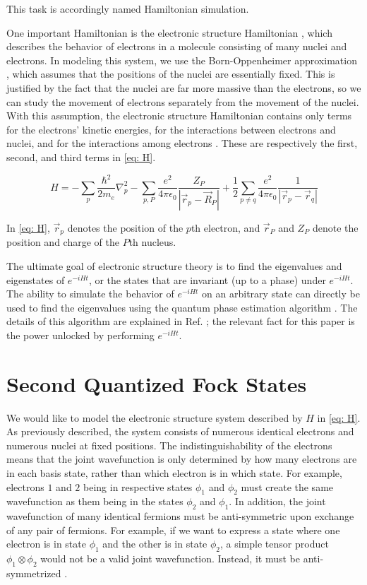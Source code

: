 This task is accordingly named Hamiltonian simulation.

One important Hamiltonian is the electronic structure Hamiltonian \cite{QCC}, which describes the behavior of electrons in a molecule consisting of many nuclei and electrons. In modeling this system, we use the Born-Oppenheimer approximation \cite{QCC}, which assumes that the positions of the nuclei are essentially fixed. This is justified by the fact that the nuclei are far more massive than the electrons, so we can study the movement of electrons separately from the movement of the nuclei. With this assumption, the electronic structure Hamiltonian contains only terms for the electrons' kinetic energies, for the interactions between electrons and nuclei, and for the interactions among electrons \cite{QCC}. These are respectively the first, second, and third terms in \eqref{eq: H}.

\begin{equation}
    H = -\sum_p \frac{\hbar^2}{2m_e} \nabla^2_p - \sum_{p, P}\frac{e^2}{4\pi\epsilon_0}\frac{Z_P}{|\vec{r}_p - \vec{R}_P|} + \frac{1}{2}\sum_{p \neq q}\frac{e^2}{4\pi\epsilon_0}\frac{1}{|\vec{r}_p - \vec{r}_q|} \label{eq: H}
\end{equation}

In \eqref{eq: H}, $\vec{r}_p$ denotes the position of the $p$th electron, and $\vec{r}_P$ and $Z_P$ denote the position and charge of the $P$th nucleus.

The ultimate goal of electronic structure theory is to find the eigenvalues and eigenstates of $e^{-iHt}$, or the states that are invariant (up to a phase) under $e^{-iHt}$. The ability to simulate the behavior of $e^{-iHt}$ on an arbitrary state can directly be used to find the eigenvalues using the quantum phase estimation algorithm \cite{QCC}. The details of this algorithm are explained in Ref. \cite{MikeIke}; the relevant fact for this paper is the power unlocked by performing $e^{-iHt}$.

\section{Second Quantized Fock States}

We would like to model the electronic structure system described by $H$ in \eqref{eq: H}. As previously described, the system consists of numerous identical electrons and numerous nuclei at fixed positions. The indistinguishability of the electrons means that the joint wavefunction is only determined by how many electrons are in each basis state, rather than which electron is in which state. For example, electrons $1$ and $2$ being in respective states $\phi_1$ and $\phi_2$ must create the same wavefunction as them being in the states $\phi_2$ and $\phi_1$. In addition, the joint wavefunction of many identical fermions must be anti-symmetric upon exchange of any pair of fermions. For example, if we want to express a state where one electron is in state $\phi_1$ and the other is in state $\phi_2$, a simple tensor product $\phi_1 \otimes \phi_2$ would not be a valid joint wavefunction. Instead, it must be anti-symmetrized \cite{QCC}.

